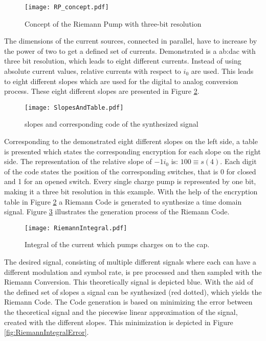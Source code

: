 \begin{figure}[H]
	\centering
  \texttt{[image: RP\_concept.pdf]}
	\caption{Concept of the Riemann Pump with three-bit resolution}
	\label{fig:RiemannPumpConcept}
\end{figure}

The dimensions of the current sources, connected in parallel, have to increase by the power of two to get a defined set of currents.
Demonstrated is a \gls{ab:dac} with three bit resolution, which leads to eight different currents.
Instead of using absolute current values, relative currents with respect to $i_0$ are used.
This leads to eight different slopes which are used for the digital to analog conversion process.
These eight different slopes are presented in Figure \ref{fig:SlopesAndTable}.

\begin{figure}[H]
	\centering
  \texttt{[image: SlopesAndTable.pdf]}
	\caption{slopes and corresponding code of the synthesized signal}
	\label{fig:SlopesAndTable}
\end{figure}

Corresponding to the demonstrated eight different slopes on the left side, a table is presented which states the corresponding encryption for each slope on the right side.
The representation of the relative slope of $-1 i_0$ is: $1 0 0 \equiv s(4)$.
Each digit of the code states the position of the corresponding switches, that is 0 for closed and 1 for an opened switch.
Every single charge pump is represented by one bit, making it a three bit resolution in this example.
With the help of the encryption table in Figure \ref{fig:SlopesAndTable} a Riemann Code is generated to synthesize a time domain signal.
Figure \ref{fig:RiemannIntegral} illustrates the generation process of the Riemann Code.

\begin{figure}[H]
	\centering
  \texttt{[image: RiemannIntegral.pdf]}
	\caption{Integral of the current which pumps charges on to the cap.}
	\label{fig:RiemannIntegral}
\end{figure}

The desired signal, consisting of multiple different signals where each can have a different modulation and symbol rate, is pre processed and then sampled with the Riemann Conversion.
This theoretically signal is depicted blue.
With the aid of the defined set of slopes a signal can be synthesized (red dotted), which yields the Riemann Code.
The Code generation is based on minimizing the error between the theoretical signal and the piecewise linear approximation of the signal, created with the different slopes.
This minimization is depicted in Figure \ref{fig:RiemannIntegralError}. 

